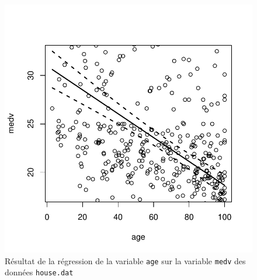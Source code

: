 \begin{solution}{2.17}
\begin{enumerate}
\begin{figure}
\begin{knitrout}
\color{fgcolor}\begin{kframe}
\begin{alltt}
 \hlkwb{<-} \hlopt{$}
 \hlopt{~}     \hlstd{=} 
\hlopt{$}
         \hlstd{=} \hlstd{,}  \hlstd{=} \hlstd{(}\hlstd{,} \hlstd{,} \hlstd{),}  \hlstd{=} \hlstd{,}
         \hlstd{=} \hlstd{,}  \hlstd{=} \hlstd{)}
\end{alltt}
\end{kframe}

{\centering \includegraphics[width=.45\linewidth]{figure/fig-simple-house3-1}

}



\end{knitrout}
        \caption{Résultat de la régression de la variable \texttt{age} sur la variable \texttt{medv} des données \texttt{house.dat}}
        \label{fig:simple:house3}
      \end{figure}
    \end{enumerate}
  
\end{solution}
